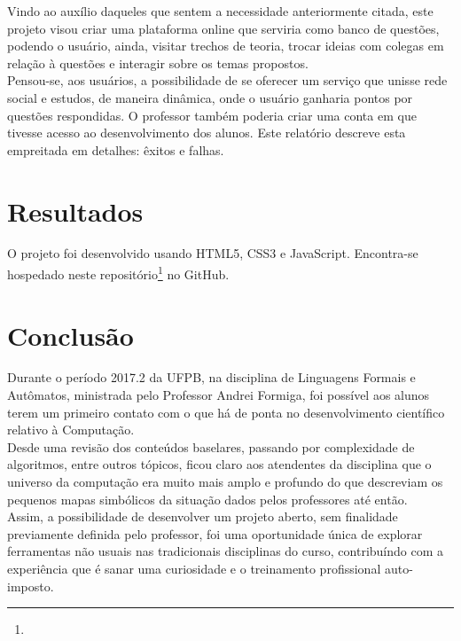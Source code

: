 \documentclass[11pt, a4paper]{article}
\begin{document}
		Vindo ao auxílio daqueles que sentem a necessidade anteriormente citada, este projeto visou criar uma plataforma online que serviria como banco de questões, podendo o usuário, ainda, visitar trechos de teoria, trocar ideias com colegas em relação à questões e interagir sobre os temas propostos.\\

		Pensou-se, aos usuários, a possibilidade de se oferecer um serviço que unisse rede social e estudos, de maneira dinâmica, onde o usuário ganharia pontos por questões respondidas. O professor também poderia criar uma conta em que tivesse acesso ao desenvolvimento dos alunos. Este relatório descreve esta empreitada em detalhes: êxitos e falhas.

	\section{Resultados}

		O projeto foi desenvolvido usando HTML5, CSS3 e JavaScript. Encontra-se hospedado neste repositório\footnote{} no GitHub.

	\section{Conclusão}

		Durante o período 2017.2 da UFPB, na disciplina de Linguagens Formais e Autômatos, ministrada pelo Professor Andrei Formiga, foi possível aos alunos terem um primeiro contato com o que há de ponta no desenvolvimento científico relativo à Computação.\\

		Desde uma revisão dos conteúdos baselares, passando por complexidade de algoritmos, entre outros tópicos, ficou claro aos atendentes da disciplina que o universo da computação era muito mais amplo e profundo do que descreviam os pequenos mapas simbólicos da situação dados pelos professores até então.\\

		Assim, a possibilidade de desenvolver um projeto aberto, sem finalidade previamente definida pelo professor, foi uma oportunidade única de explorar ferramentas não usuais nas tradicionais disciplinas do curso, contribuíndo com a experiência que é sanar uma curiosidade e o treinamento profissional auto-imposto.
\end{document}
